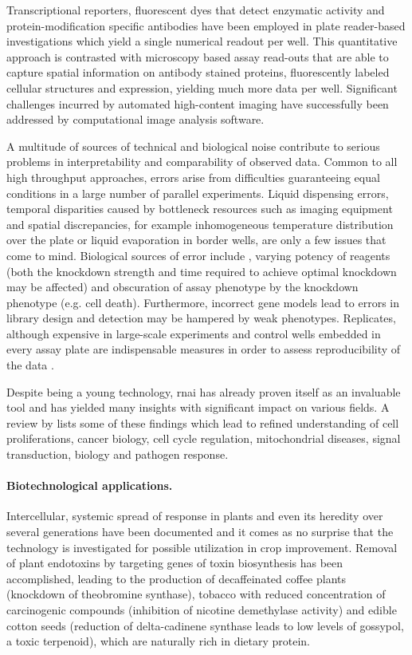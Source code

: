 Transcriptional reporters, fluorescent dyes that detect enzymatic activity and protein-modification specific antibodies have been employed in plate reader-based investigations which yield a single numerical readout per well. This quantitative approach is contrasted with microscopy based assay read-outs that are able to capture spatial information on antibody stained proteins, fluorescently labeled cellular structures and  expression, yielding much more data per well. Significant challenges incurred by automated high-content imaging have successfully been addressed by computational image analysis software.

A multitude of sources of technical and biological noise contribute to serious problems in interpretability and comparability of observed data. Common to all high throughput approaches, errors arise from difficulties guaranteeing equal conditions in a large number of parallel experiments. Liquid dispensing errors, temporal disparities caused by bottleneck resources such as imaging equipment and spatial discrepancies, for example inhomogeneous temperature distribution over the plate or liquid evaporation in border wells, are only a few issues that come to mind. Biological sources of error include , varying potency of reagents (both the knockdown strength and time required to achieve optimal knockdown may be affected) and obscuration of assay phenotype by the knockdown phenotype (e.g. cell death). Furthermore, incorrect gene models lead to errors in library design and detection may be hampered by weak phenotypes. Replicates, although expensive in large-scale experiments and control wells embedded in every assay plate are indispensable measures in order to assess reproducibility of the data \citep{Echeverri2006,Perrimon2007}.

Despite being a young technology, \acrlong{rnai} has already proven itself as an invaluable tool and has yielded many insights with significant impact on various fields. A review by \citet{Mohr2010} lists some of these findings which lead to refined understanding of cell proliferations, cancer biology, cell cycle regulation, mitochondrial diseases, signal transduction,  biology and pathogen response. 

\paragraph{Biotechnological applications.}
Intercellular, systemic spread of  response in plants and even its heredity over several generations have been documented and it comes as no surprise that the technology is investigated for possible utilization in crop improvement. Removal of plant endotoxins by targeting genes of toxin biosynthesis has been accomplished, leading to the production of decaffeinated coffee plants (knockdown of theobromine synthase), tobacco with reduced concentration of carcinogenic compounds (inhibition of nicotine demethylase activity) and edible cotton seeds (reduction of delta-cadinene synthase leads to low levels of gossypol, a toxic terpenoid), which are naturally rich in dietary protein.

